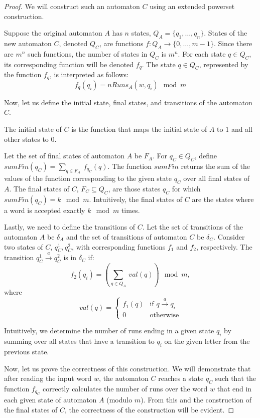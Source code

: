 \documentclass[en]{pracamgr}
\theoremstyle{definition}
\begin{document}
\begin{proof}
    We will construct such an automaton $C$ using an extended powerset construction.

    Suppose the original automaton $A$ has $n$ states, $Q_A = \{q_1, \ldots, q_n\}$. States of the new automaton $C$, denoted $Q_C$, are functions $f: Q_A \rightarrow \{0, \ldots, m-1 \}$. Since there are $m^n$ such functions, the number of states in $Q_C$ is $m^n$. For each state $q \in Q_C$, its corresponding function will be denoted $f_q$. The state $q \in Q_C$, represented by the function $f_q$, is interpreted as follows:
    $$f_q(q_i) = nRuns_A(w, q_i) \mod m$$

    Now, let us define the initial state, final states, and transitions of the automaton $C$.

    The initial state of $C$ is the function that maps the initial state of $A$ to $1$ and all other states to $0$.

    Let the set of final states of automaton $A$ be $F_A$. For $q_C \in Q_C$, define $sumFin(q_C) = \sum_{q \in F_A} \ f_{q_C}(q)$. The function $sumFin$ returns the sum of the values of the function corresponding to the given state $q_C$ over all final states of $A$. The final states of $C$, $F_C \subseteq Q_C$, are those states $q_C$ for which $sumFin(q_C) = k \mod m$. Intuitively, the final states of $C$ are the states where a word is accepted exactly $k \mod m$ times.

    Lastly, we need to define the transitions of $C$. Let the set of transitions of the automaton $A$ be $\delta_A$ and the set of transitions of automaton $C$ be $\delta_C$. Consider two states of $C$, $q_C^1, q_C^2$, with corresponding functions $f_1$ and $f_2$, respectively. The transition $q_C^1 \xrightarrow{a} q_C^2$ is in $\delta_C$ if:
    $$f_2(q_i) = (\sum_{q \in Q_A} \ val(q)) \mod m,$$
    where
    \begin{equation*}
        val(q) =
            \begin{cases}
            f_1(q) & \text{if $q \xrightarrow{a} q_i$} \\
            0 & \text{otherwise}
            \end{cases}       
    \end{equation*}

    Intuitively, we determine the number of runs ending in a given state $q_i$ by summing over all states that have a transition to $q_i$ on the given letter from the previous state.

    Now, let us prove the correctness of this construction. We will demonstrate that after reading the input word $w$, the automaton $C$ reaches a state $q_C$ such that the function $f_{q_C}$ correctly calculates the number of runs over the word $w$ that end in each given state of automaton $A$ (modulo $m$). From this and the construction of the final states of $C$, the correctness of the construction will be evident.


\end{proof}
\end{document}
